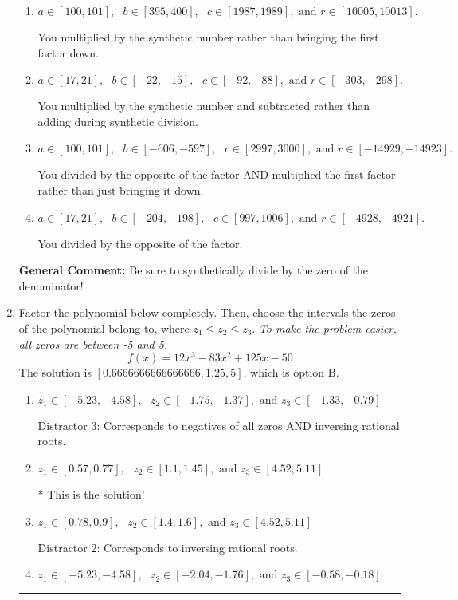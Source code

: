 \documentclass{extbook}[14pt]
\newcommand{\litem}[1]{\item #1

\rule{\textwidth}{0.4pt}}
\begin{document}
\begin{enumerate}
{\begin{enumerate}[label=\Alph*.]
* This is the solution!
\item \( a \in [100, 101], \text{   } b \in [395, 400], \text{   } c \in [1987, 1989], \text{   and   } r \in [10005, 10013]. \)

 You multiplied by the synthetic number rather than bringing the first factor down.
\item \( a \in [17, 21], \text{   } b \in [-22, -15], \text{   } c \in [-92, -88], \text{   and   } r \in [-303, -298]. \)

 You multiplied by the synthetic number and subtracted rather than adding during synthetic division.
\item \( a \in [100, 101], \text{   } b \in [-606, -597], \text{   } c \in [2997, 3000], \text{   and   } r \in [-14929, -14923]. \)

 You divided by the opposite of the factor AND multiplied the first factor rather than just bringing it down.
\item \( a \in [17, 21], \text{   } b \in [-204, -198], \text{   } c \in [997, 1006], \text{   and   } r \in [-4928, -4921]. \)

 You divided by the opposite of the factor.
\end{enumerate}

\textbf{General Comment:} Be sure to synthetically divide by the zero of the denominator!
}
\litem{
Factor the polynomial below completely. Then, choose the intervals the zeros of the polynomial belong to, where $z_1 \leq z_2 \leq z_3$. \textit{To make the problem easier, all zeros are between -5 and 5.}
\[ f(x) = 12x^{3} -83 x^{2} +125 x -50 \]The solution is \( [0.6666666666666666, 1.25, 5] \), which is option B.\begin{enumerate}[label=\Alph*.]
\item \( z_1 \in [-5.23, -4.58], \text{   }  z_2 \in [-1.75, -1.37], \text{   and   } z_3 \in [-1.33, -0.79] \)

 Distractor 3: Corresponds to negatives of all zeros AND inversing rational roots.
\item \( z_1 \in [0.57, 0.77], \text{   }  z_2 \in [1.1, 1.45], \text{   and   } z_3 \in [4.52, 5.11] \)

* This is the solution!
\item \( z_1 \in [0.78, 0.9], \text{   }  z_2 \in [1.4, 1.6], \text{   and   } z_3 \in [4.52, 5.11] \)

 Distractor 2: Corresponds to inversing rational roots.
\item \( z_1 \in [-5.23, -4.58], \text{   }  z_2 \in [-2.04, -1.76], \text{   and   } z_3 \in [-0.58, -0.18] \)


\end{enumerate}}
\end{enumerate}
\end{document}
